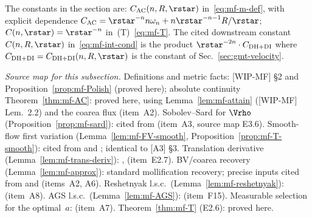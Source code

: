 The constants in the section are:
$C_{\rm AC}(n,R,\rstar)$ in~\eqref{eq:mf-m-def}, with explicit
dependence $C_{\rm AC}=\rstar^{-n}n\omega_n+n\rstar^{-n-1}R/\rstar$;
$C(n,\rstar)=\rstar^{-n}$ in~(T)~\eqref{eq:mf-T}. The cited downstream
constant $C(n,R,\rstar)$ in~\eqref{eq:mf-int-cond} is the product
$\rstar^{-2n}\cdot C_{\rm DH+DI}$ where $C_{\rm DH+DI}=C_{\rm DH+DI}(n,R,
\rstar)$ is the constant of Sec.~\ref{sec:gmt-velocity}.

\medskip\noindent
\emph{Source map for this subsection.} Definitions and metric facts:
[WIP-MF] \S2 and Proposition~\ref{prop:mf-Polish} (proved here);
absolute continuity Theorem~\ref{thm:mf-AC}: proved here, using
Lemma~\ref{lem:mf-attain} ([WIP-MF] Lem.~2.2) and the coarea flux
\cite[Thm.~13.1]{Maggi2012} (item~A2). Sobolev--Sard for
$\Vrho$ (Proposition~\ref{prop:mf-sard}): cited from
\cite[App.~A, Thm.~A.1]{FigalliMaggi2011} (item~A3, source map E3.6).
Smooth-flow first variation (Lemma~\ref{lem:mf-FV-smooth},
Proposition~\ref{prop:mf-T-smooth}): cited from
\cite[\S~17.3]{Maggi2012} and \cite[Thm.~3.85]{AFP2000}; identical to
[A3] \S3. Translation derivative (Lemma~\ref{lem:mf-trans-deriv}):
\cite[Thm.~13.8]{Maggi2012}, \cite[Thm.~3.84]{AFP2000} (item~E2.7).
BV/coarea recovery (Lemma~\ref{lem:mf-approx}): standard mollification
recovery; precise inputs cited from \cite[Thm.~13.1, Prop.~12.15,
Cor.~12.21]{Maggi2012} and \cite[Thm.~3.40]{AFP2000} (items~A2, A6).
Reshetnyak l.s.c.\ (Lemma~\ref{lem:mf-reshetnyak}):
\cite[Thm.~2.38--2.39]{AFP2000} (item~A8). AGS l.s.c.\
(Lemma~\ref{lem:mf-AGS}): \cite[Thm.~1.1.2]{AGS2008} (item~F15).
Measurable selection for the optimal~$a$:
\cite[Thm.~8.2.11]{AubinFrankowska1990} (item~A7).
Theorem~\ref{thm:mf-T} (E2.6): proved here.
